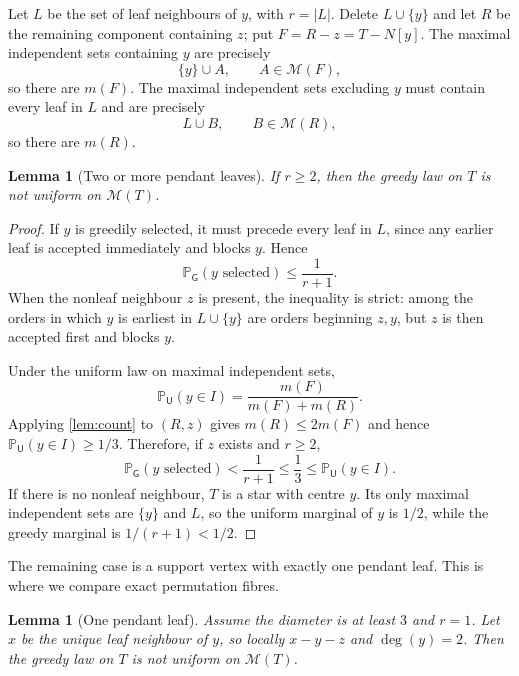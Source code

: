 \documentclass[11pt]{article}
\newtheorem{lemma}[theorem]{Lemma}
\theoremstyle{definition}
\newcommand{\M}{\mathcal{M}}
\newcommand{\GG}{\mathsf{G}}
\newcommand{\UU}{\mathsf{U}}
\newcommand{\Prob}{\mathbb{P}}
\begin{document}
Let $L$ be the set of leaf neighbours of $y$, with $r=|L|$.  Delete $L\cup\{y\}$ and let $R$ be the remaining component containing $z$; put $F=R-z=T-N[y]$.  The maximal independent sets containing $y$ are precisely
\[
 \{y\}\cup A,\qquad A\in\M(F),
\]
so there are $m(F)$.  The maximal independent sets excluding $y$ must contain every leaf in $L$ and are precisely
\[
 L\cup B,\qquad B\in\M(R),
\]
so there are $m(R)$.

\begin{lemma}[Two or more pendant leaves]\label{lem:multileaf}
If $r\ge2$, then the greedy law on $T$ is not uniform on $\M(T)$.
\end{lemma}

\begin{proof}
If $y$ is greedily selected, it must precede every leaf in $L$, since any earlier leaf is accepted immediately and blocks $y$.  Hence
\[
 \Prob_{\GG}(y\text{ selected})\le\frac1{r+1}.
\]
When the nonleaf neighbour $z$ is present, the inequality is strict: among the orders in which $y$ is earliest in $L\cup\{y\}$ are orders beginning $z,y$, but $z$ is then accepted first and blocks $y$.

Under the uniform law on maximal independent sets,
\[
 \Prob_{\UU}(y\in I)=\frac{m(F)}{m(F)+m(R)}.
\]
Applying \cref{lem:count} to $(R,z)$ gives $m(R)\le2m(F)$ and hence $\Prob_{\UU}(y\in I)\ge1/3$.  Therefore, if $z$ exists and $r\ge2$,
\[
 \Prob_{\GG}(y\text{ selected})
 <\frac1{r+1}\le\frac13\le\Prob_{\UU}(y\in I).
\]
If there is no nonleaf neighbour, $T$ is a star with centre $y$.  Its only maximal independent sets are $\{y\}$ and $L$, so the uniform marginal of $y$ is $1/2$, while the greedy marginal is $1/(r+1)<1/2$.
\end{proof}

The remaining case is a support vertex with exactly one pendant leaf.  This is where we compare exact permutation fibres.

\begin{lemma}[One pendant leaf]\label{lem:oneleaf}
Assume the diameter is at least $3$ and $r=1$.  Let $x$ be the unique leaf neighbour of $y$, so locally $x-y-z$ and $\deg(y)=2$.  Then the greedy law on $T$ is not uniform on $\M(T)$.
\end{lemma}
\end{document}
